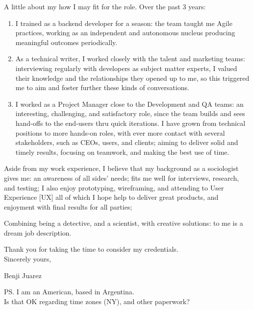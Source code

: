 A little about my how I may fit for the role. Over the past 3 years:


\begin{enumerate}
\item 
I trained as a backend developer for a season: 
the team taught me Agile practices, working as an independent
and autonomous nucleus producing meaningful outcomes periodically.
\item 
As a technical writer, I worked closely with the talent and
marketing teams: interviewing regularly with developers as subject
matter experts, I valued their knowledge and the relationships they
opened up to me, so this triggered me to aim and foster further these
kinds of conversations.
\item 
I worked as a Project Manager close to the
Development and QA teams: 
an interesting, challenging, and satisfactory role, 
since the team builds and sees hand-offs to the end-users thru quick iterations. 
I have grown from technical positions to more hands-on
roles, with ever more contact with several stakeholders, such as CEOs,
users, and clients; aiming to deliver solid and timely results, focusing
on teamwork, and making the best use of time.
\end{enumerate}

Aside from my work experience, 
I believe that my background as a sociologist gives me:
  an awareness of all sides' needs;
  fits me well for interviews, research, and testing;
  I also enjoy prototyping, wireframing, and attending to User
  Experience {[}UX{]} all of which I hope help to deliver great
  products, and enjoyment with final results for all parties;

Combining being a detective, and a scientist, with creative solutions:
  to me is a dream job description.

\vspace{-\topsep}

Thank you for taking the time to consider my credentials.\\
Sincerely yours,

Benji Juarez

PS. I am an American, based in Argentina. \\
Is that OK regarding time zones (NY), and other paperwork?
